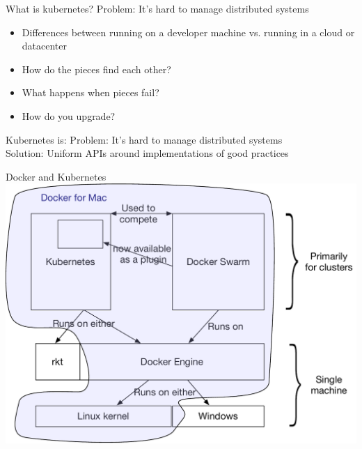 \documentclass[xcolor=svgnames,17pt]{beamer}
\begin{document}
\begin{frame}{What is kubernetes?}
Problem: It’s hard to manage distributed systems
\\[\baselineskip]
\pause
{}
\pause
\begin{itemize}
\item Differences between running on a developer machine vs. running in a
cloud or datacenter
\item How do the pieces find each other?
\item What happens when pieces fail?
\item How do you upgrade?
\end{itemize}
\end{frame}

\begin{frame}{Kubernetes is:}
Problem: It’s hard to manage distributed systems
\\[\baselineskip]
Solution: Uniform APIs around implementations of good practices
\end{frame}

\begin{frame}{Docker and Kubernetes}
\includegraphics[width=0.8\paperwidth,center]{docker-k8s-connection.pdf}
\end{frame}
\end{document}
